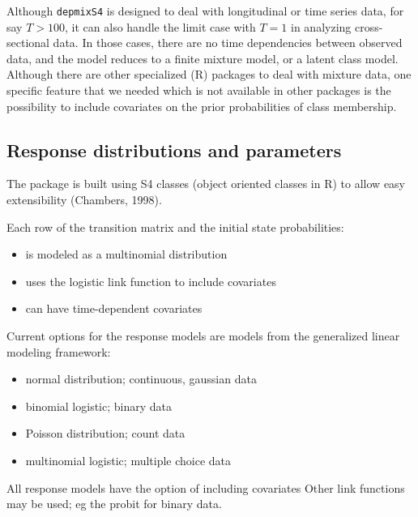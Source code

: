\documentclass[a4paper,12pt,man]{apa} %
\newcommand{\pkg}{\texttt}
\begin{document}
Although \pkg{depmixS4} is designed to deal with longitudinal or time
series data, for say $T>100$, it can also handle the limit case with
$T=1$ in analyzing cross-sectional data.  In those cases, there are no
time dependencies between observed data, and the model reduces to a
finite mixture model, or a latent class model.  Although there are
other specialized (R) packages to deal with mixture data, one specific
feature that we needed which is not available in other packages is the
possibility to include covariates on the prior probabilities of class
membership.


\subsection{Response distributions and parameters}

The package is built using S4 classes (object oriented classes in R)
to allow easy extensibility (Chambers, 1998).

Each row of the transition matrix and the initial state probabilities:
\begin{itemize}
	\item is modeled as a multinomial distribution
	\item uses the logistic link function to include covariates
	\item can have time-dependent covariates
\end{itemize}

Current options for the response models are models from the
generalized linear modeling framework:

\begin{itemize}
	\item normal distribution; continuous, gaussian data
	\item binomial logistic; binary data
	\item Poisson distribution; count data
	\item multinomial logistic; multiple choice data
\end{itemize}

All response models have the option of including covariates
Other link functions may be used; eg the probit for binary data.
\end{document}

